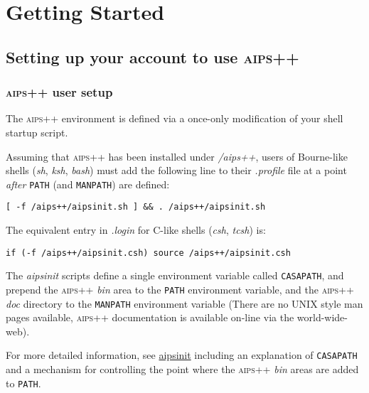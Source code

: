 \chapter{Getting Started \label{HowTo.GettingStarted}}
\section{Setting up your account to use \textsc{aips++}}
\label{Users}
\subsection{\textsc{aips++} user setup}

The \textsc{aips++} environment is defined via a once-only modification of your
shell startup script.

Assuming that \textsc{aips++} has been installed under \textsl{/aips++}, users of
Bourne-like shells (\textit{sh}, \textit{ksh}, \textit{bash}) must add the following line to
their \textsl{.profile} file at a point \emph{after} \texttt{PATH} (and
\texttt{MANPATH}) are defined:

\begin{verbatim}
[ -f /aips++/aipsinit.sh ] && . /aips++/aipsinit.sh
\end{verbatim}

\noindent
The equivalent entry in \textsl{.login} for C-like shells (\textit{csh}, \textit{tcsh})
is:

\begin{verbatim}
if (-f /aips++/aipsinit.csh) source /aips++/aipsinit.csh
\end{verbatim}

The \textit{aipsinit} scripts define a single environment variable called
\texttt{CASAPATH}, and prepend the \textsc{aips++} \textsl{bin} area to the
\texttt{PATH} environment variable, and the \textsc{aips++} \textsl{doc} directory to
the \texttt{MANPATH} environment variable (There are no UNIX style man pages
available, \textsc{aips++} documentation is available on-line via the
world-wide-web).

For more detailed information, see \hyperref{aipsinit}{aipsinit(see AIPS++ System Manual, Section }{for more details)}{aipsinit}
including an explanation of \texttt{CASAPATH} and a mechanism
for controlling the point where the \textsc{aips++} \textsl{bin} areas are added to
\texttt{PATH}.



\label{Programmers}

